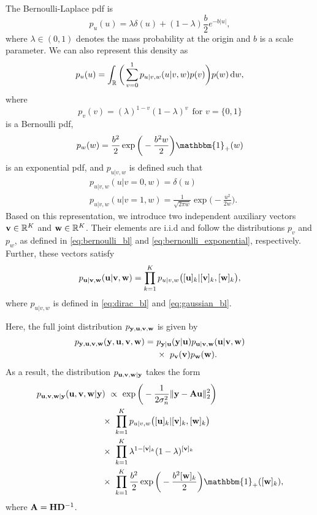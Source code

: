 \documentclass[journal]{IEEEtran}
\begin{document}
The Bernoulli-Laplace pdf is
\begin{equation}\label{eq:pdf_bl}
    p_u(u) = \lambda \delta(u) + (1-\lambda)\frac{b}{2}e^{-b |u|},
\end{equation}
where $\lambda \in (0,1)$ denotes the mass probability at the origin and $b$ is a scale parameter. We can also represent this density as
\begin{equation}
    p_u(u) = \int_{\mathbb{R}} \bigg(\sum_{v=0}^{1} p_{u|v, w}(u|v, w) p(v) \bigg) p(w) \,\mathrm{d} w,
\end{equation}
where
\begin{equation}\label{eq:bernoulli_bl}
    p_{v}(v) = (\lambda)^{1-v}(1-\lambda)^{v} \ \ \text{for } v = \{0,1\}
\end{equation}
is a Bernoulli pdf,
\begin{equation}\label{eq:bernoulli_exponential}
    p_{w}(w) = \frac{b^2}{2}\exp\bigg(-\frac{b^2 w}{2}\bigg) \mathbbm{1}_{+}(w)
\end{equation}
is an exponential pdf, and $p_{u|v, w}$ is defined such that
\begin{align}
    &p_{u|v, w}(u|v=0, w) = \delta(u) \label{eq:dirac_bl}\\
    &p_{u|v, w}(u|v=1, w) = \frac{1}{\sqrt{2 \pi w}} \exp\bigg(-\frac{u^2}{2 w}\bigg) \label{eq:gaussian_bl}.
\end{align}
Based on this representation, we introduce two independent auxiliary vectors ${\bf{v}} \in \mathbb{R}^K$ and ${\bf{w}} \in \mathbb{R}^K$. Their elements are i.i.d and follow the distributions $p_{v}$ and $p_{w}$, as defined in \eqref{eq:bernoulli_bl} and \eqref{eq:bernoulli_exponential}, respectively. Further, these vectors satisfy
\begin{equation}\label{eq:aux_var_property_bl}
    p_{{\bf{u}} | {\bf{v}}, {\bf{w}}}({\bf{u}} | {\bf{v}}, {\bf{w}}) = \prod_{k=1}^{K}p_{u|v, w}\big([{\bf{u}}]_k | [{\bf{v}}]_k, [{\bf{w}}]_k\big),
\end{equation}
where $p_{u|v, w}$ is defined in \eqref{eq:dirac_bl} and \eqref{eq:gaussian_bl}.

Here, the full joint distribution $p_{{\bf{y}}, {\bf{u}}, {\bf{v}}, {\bf{w}}}$ is given by
\begin{align}
    p_{{\bf{y}}, {\bf{u}}, {\bf{v}}, {\bf{w}}}({\bf{y}}, {\bf{u}}, {\bf{v}}, {\bf{w}}) = \ &p_{{\bf{y}} | {\bf{u}}}({\bf{y}} | {\bf{u}}) p_{{\bf{u}} | {\bf{v}}, {\bf{w}}}({\bf{u}} | {\bf{v}}, {\bf{w}}) \nonumber \\
    &\times \ p_{{\bf{v}}}({\bf{v}}) p_{{\bf{w}}}({\bf{w}}).
\end{align}
As a result, the distribution $p_{{\bf{u}}, {\bf{v}}, {\bf{w}}|{\bf{y}}}$ takes the form
\begin{align}\label{eq:conditional_joint_distribution_bl}
    p_{\M u, \M v, \M w | \M y}(\M u, \M v, \M w | \M y&) \ \propto \ \exp\bigg(-\frac{1}{2 \sigma_n^2} \|\M y - \M A \M u \|_{2}^{2}\bigg) \nonumber \\
    &\times \ \prod_{k=1}^{K}p_{u|v, w}\big([\M u]_k | [\M v]_k, [\M w]_k\big) \nonumber \\
    &\times \ \prod_{k=1}^{K} \lambda^{1-[\M v]_k}(1-\lambda)^{[\M v]_k} \nonumber \\
    &\times \ \prod_{k=1}^{K} \frac{b^2}{2}\exp\bigg(-\frac{b^2 [\M w]_k}{2}\bigg) \mathbbm{1}_{+}([\M w]_k),
\end{align}
where ${\bf{A}} = {\bf{H}} {\bf{D}}^{-1}$.
\end{document}
